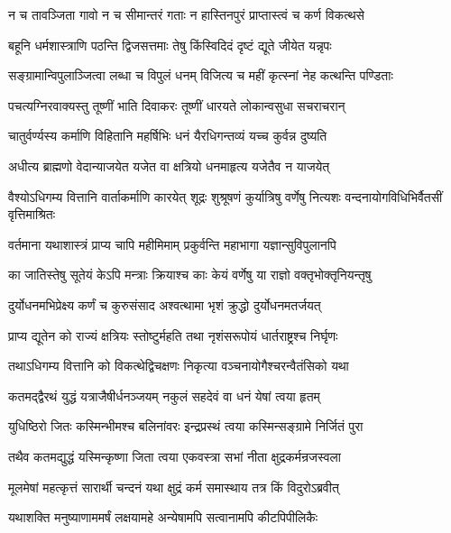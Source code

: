 \twolineshloka
{न च तावञ्जिता गावो न च सीमान्तरं गताः}
{न हास्तिनपुरं प्राप्तास्त्वं च कर्ण विकत्थसे}


\twolineshloka
{बहूनि धर्मशास्त्राणि पठन्ति द्विजसत्तमाः}
{तेषु किंस्विदिदं दृष्टं द्यूते जीयेत यन्नृपः}


\twolineshloka
{सङ्ग्रामान्विपुलाञ्जित्वा लब्धा च विपुलं धनम्}
{विजित्य च महीं कृत्स्नां नेह कत्थन्ति पण्डिताः}


\twolineshloka
{पचत्यग्निरवाक्यस्तु तूष्णीं भाति दिवाकरः}
{तूष्णीं धारयते लोकान्वसुधा सचराचरान्}


\twolineshloka
{चातुर्वर्ण्यस्य कर्माणि विहितानि महर्षिभिः}
{धनं यैरधिगन्तव्यं यच्च कुर्वन्न दुष्यति}


\twolineshloka
{अधीत्य ब्राह्मणो वेदान्याजयेत यजेत वा}
{क्षत्रियो धनमाहृत्य यजेतैव न याजयेत्}


\onelineshloka
{वैश्योऽधिगम्य वित्तानि वार्ताकर्माणि कारयेत्}
\twolineshloka
{शूद्रः शुश्रूषणं कुर्यात्रिषु वर्णेषु नित्यशः}
{वन्दनायोगविधिभिर्वैतसीं वृत्तिमाश्रितः}


\twolineshloka
{वर्तमाना यथाशास्त्रं प्राप्य चापि महीमिमाम्}
{प्रकुर्वन्ति महाभागा यज्ञान्सुविपुलानपि}


\twolineshloka
{का जातिस्तेषु सूतेयं केऽपि मन्त्राः क्रियाश्च काः}
{केयं वर्णेषु या राज्ञो वक्तृभोक्तृनियन्तृषु}



\twolineshloka
{दुर्योधनमभिप्रेक्ष्य कर्णं च कुरुसंसाद}
{अश्वत्थामा भृशं क्रुद्धो दुर्योधनमतर्जयत्}


\twolineshloka
{प्राप्य द्यूतेन को राज्यं क्षत्रियः स्तोष्टुर्महति}
{तथा नृशंसरूपोयं धार्तराष्ट्रश्च निर्घृणः}


\twolineshloka
{तथाऽधिगम्य वित्तानि को विकत्थेद्विचक्षणः}
{निकृत्या वञ्चनायोगैश्चरन्वैतंसिको यथा}


\twolineshloka
{कतमद्द्वैरथं युद्धं यत्राजैषीर्धनञ्जयम्}
{नकुलं सहदेवं वा धनं येषां त्वया हृतम्}


\twolineshloka
{युधिष्ठिरो जितः कस्मिन्भीमश्च बलिनांवरः}
{इन्द्रप्रस्थं त्वया कस्मिन्सङ्ग्रामे निर्जितं पुरा}


\twolineshloka
{तथैव कतमद्युद्धं यस्मिन्कृष्णा जिता त्वया}
{एकवस्त्रा सभां नीता क्षुद्रकर्मन्रजस्वला}


\twolineshloka
{मूलमेषां महत्कृत्तं सारार्थी चन्दनं यथा}
{क्षुद्रं कर्म समास्थाय तत्र किं विदुरोऽब्रवीत्}


\twolineshloka
{यथाशक्ति मनुष्याणाममर्षं लक्षयामहे}
{अन्येषामपि सत्वानामपि कीटपिपीलिकैः}


